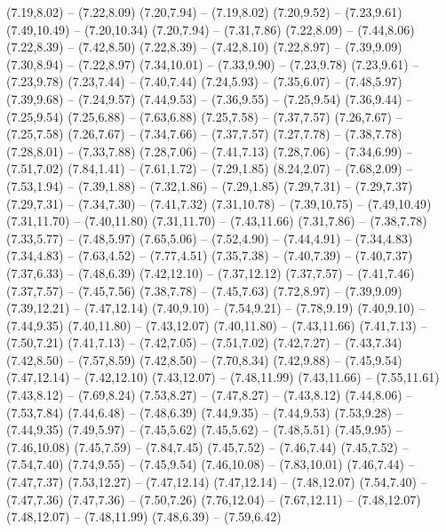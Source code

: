{  (7.19,8.02) -- (7.22,8.09)
  (7.20,7.94) -- (7.19,8.02)
  (7.20,9.52) -- (7.23,9.61)
  (7.49,10.49) -- (7.20,10.34)
  (7.20,7.94) -- (7.31,7.86)
  (7.22,8.09) -- (7.44,8.06)
  (7.22,8.39) -- (7.42,8.50)
  (7.22,8.39) -- (7.42,8.10)
  (7.22,8.97) -- (7.39,9.09)
  (7.30,8.94) -- (7.22,8.97)
  (7.34,10.01) -- (7.33,9.90) -- (7.23,9.78)
  (7.23,9.61) -- (7.23,9.78)
  (7.23,7.44) -- (7.40,7.44)
  (7.24,5.93) -- (7.35,6.07) -- (7.48,5.97)
  (7.39,9.68) -- (7.24,9.57)
  (7.44,9.53) -- (7.36,9.55) -- (7.25,9.54)
  (7.36,9.44) -- (7.25,9.54)
  (7.25,6.88) -- (7.63,6.88)
  (7.25,7.58) -- (7.37,7.57)
  (7.26,7.67) -- (7.25,7.58)
  (7.26,7.67) -- (7.34,7.66) -- (7.37,7.57)
  (7.27,7.78) -- (7.38,7.78)
  (7.28,8.01) -- (7.33,7.88)
  (7.28,7.06) -- (7.41,7.13)
  (7.28,7.06) -- (7.34,6.99) -- (7.51,7.02)
  (7.84,1.41) -- (7.61,1.72) -- (7.29,1.85)
  (8.24,2.07) -- (7.68,2.09) -- (7.53,1.94) -- (7.39,1.88) -- (7.32,1.86) -- (7.29,1.85)
  (7.29,7.31) -- (7.29,7.37)
  (7.29,7.31) -- (7.34,7.30) -- (7.41,7.32)
  (7.31,10.78) -- (7.39,10.75) -- (7.49,10.49)
  (7.31,11.70) -- (7.40,11.80)
  (7.31,11.70) -- (7.43,11.66)
  (7.31,7.86) -- (7.38,7.78)
  (7.33,5.77) -- (7.48,5.97)
  (7.65,5.06) -- (7.52,4.90) -- (7.44,4.91) -- (7.34,4.83)
  (7.34,4.83) -- (7.63,4.52) -- (7.77,4.51)
  (7.35,7.38) -- (7.40,7.39) -- (7.40,7.37)
  (7.37,6.33) -- (7.48,6.39)
  (7.42,12.10) -- (7.37,12.12)
  (7.37,7.57) -- (7.41,7.46)
  (7.37,7.57) -- (7.45,7.56)
  (7.38,7.78) -- (7.45,7.63)
  (7.72,8.97) -- (7.39,9.09)
  (7.39,12.21) -- (7.47,12.14)
  (7.40,9.10) -- (7.54,9.21) -- (7.78,9.19)
  (7.40,9.10) -- (7.44,9.35)
  (7.40,11.80) -- (7.43,12.07)
  (7.40,11.80) -- (7.43,11.66)
  (7.41,7.13) -- (7.50,7.21)
  (7.41,7.13) -- (7.42,7.05) -- (7.51,7.02)
  (7.42,7.27) -- (7.43,7.34)
  (7.42,8.50) -- (7.57,8.59)
  (7.42,8.50) -- (7.70,8.34)
  (7.42,9.88) -- (7.45,9.54)
  (7.47,12.14) -- (7.42,12.10)
  (7.43,12.07) -- (7.48,11.99)
  (7.43,11.66) -- (7.55,11.61)
  (7.43,8.12) -- (7.69,8.24)
  (7.53,8.27) -- (7.47,8.27) -- (7.43,8.12)
  (7.44,8.06) -- (7.53,7.84)
  (7.44,6.48) -- (7.48,6.39)
  (7.44,9.35) -- (7.44,9.53)
  (7.53,9.28) -- (7.44,9.35)
  (7.49,5.97) -- (7.45,5.62)
  (7.45,5.62) -- (7.48,5.51)
  (7.45,9.95) -- (7.46,10.08)
  (7.45,7.59) -- (7.84,7.45)
  (7.45,7.52) -- (7.46,7.44)
  (7.45,7.52) -- (7.54,7.40)
  (7.74,9.55) -- (7.45,9.54)
  (7.46,10.08) -- (7.83,10.01)
  (7.46,7.44) -- (7.47,7.37)
  (7.53,12.27) -- (7.47,12.14)
  (7.47,12.14) -- (7.48,12.07)
  (7.54,7.40) -- (7.47,7.36)
  (7.47,7.36) -- (7.50,7.26)
  (7.76,12.04) -- (7.67,12.11) -- (7.48,12.07)
  (7.48,12.07) -- (7.48,11.99)
  (7.48,6.39) -- (7.59,6.42)
}

